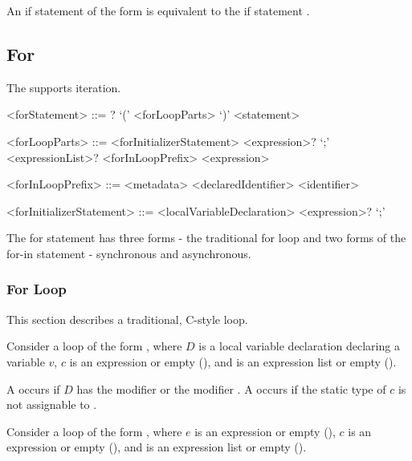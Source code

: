 \documentclass[makeidx]{article}
\begin{document}
{\LMHash{}%
An if statement of the form  is equivalent to
the if statement .


\subsection{For}

\LMHash{}%
The  supports iteration.

\begin{grammar}
<forStatement> ::= \AWAIT? \FOR{} `(' <forLoopParts> `)' <statement>

<forLoopParts> ::= <forInitializerStatement> <expression>? `;' <expressionList>?
  \alt <forInLoopPrefix> \IN{} <expression>

<forInLoopPrefix> ::= <metadata> <declaredIdentifier>
  \alt <identifier>

<forInitializerStatement> ::= <localVariableDeclaration>
  \alt <expression>? `;'
\end{grammar}

\LMHash{}%
The for statement has three forms - the traditional for loop
and two forms of the for-in statement - synchronous and asynchronous.


\subsubsection{For Loop}

\LMHash{}%
This section describes a traditional, C-style \FOR{} loop.

\LMHash{}%
Consider a loop of the form
,
where $D$ is a local variable declaration declaring a variable $v$,
$c$ is an expression or empty
(),
and  is an expression list or empty
().

\LMHash{}%
A  occurs if $D$ has
the modifier \CONST{} or the modifier \LATE.
A  occurs if the static type of $c$ is not
assignable to .

\LMHash{}%
Consider a loop of the form
,
where $e$ is an expression or empty
(),
$c$ is an expression or empty
(),
and  is an expression list or empty
().

}
\end{document}
